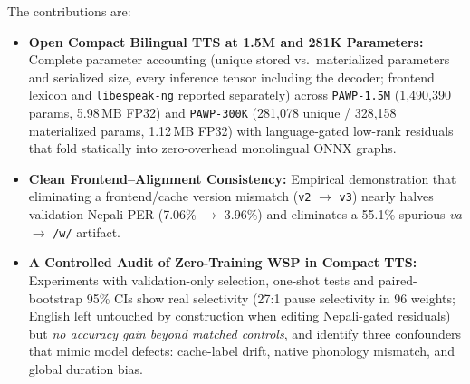 The contributions are:
\begin{itemize}
  \item \textbf{Open Compact Bilingual TTS at 1.5M and 281K Parameters:} Complete parameter accounting (unique stored vs.\ materialized parameters and serialized size, every inference tensor including the decoder; frontend lexicon and \texttt{libespeak-ng} reported separately) across \texttt{PAWP-1.5M} (1,490,390 params, 5.98\,MB FP32) and \texttt{PAWP-300K} (281,078 unique / 328,158 materialized params, 1.12\,MB FP32) with language-gated low-rank residuals that fold statically into zero-overhead monolingual ONNX graphs.
  \item \textbf{Clean Frontend--Alignment Consistency:} Empirical demonstration that eliminating a frontend/cache version mismatch (\texttt{v2} $\rightarrow$ \texttt{v3}) nearly halves validation Nepali PER (7.06\% $\rightarrow$ 3.96\%) and eliminates a 55.1\% spurious \textit{va} $\rightarrow$ \texttt{/w/} artifact.
  \item \textbf{A Controlled Audit of Zero-Training WSP in Compact TTS:} Experiments with validation-only selection, one-shot tests and paired-bootstrap 95\% CIs show real selectivity (27:1 pause selectivity in 96 weights; English left untouched by construction when editing Nepali-gated residuals) but \emph{no accuracy gain beyond matched controls}, and identify three confounders that mimic model defects: cache-label drift, native phonology mismatch, and global duration bias.
\end{itemize}
